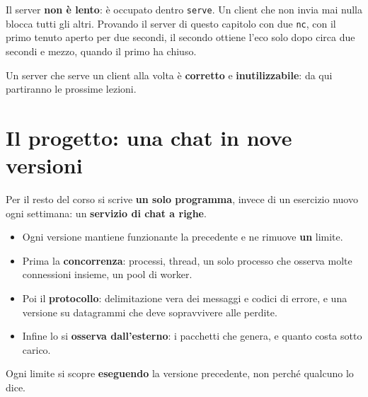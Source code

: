 Il server \textbf{non è lento}: è occupato dentro \texttt{serve}. Un client che non invia mai nulla blocca tutti gli
altri. Provando il server di questo capitolo con due \texttt{nc}, con il primo tenuto aperto per due secondi, il secondo
ottiene l'eco solo dopo circa due secondi e mezzo, quando il primo ha chiuso.

Un server che serve un client alla volta è \textbf{corretto} e \textbf{inutilizzabile}: da qui partiranno le prossime
lezioni.

\section{Il progetto: una chat in nove versioni}

Per il resto del corso si scrive \textbf{un solo programma}, invece di un esercizio nuovo ogni settimana: un
\textbf{servizio di chat a righe}.
\begin{itemize}
    \item Ogni versione mantiene funzionante la precedente e ne rimuove \textbf{un} limite.
    \item Prima la \textbf{concorrenza}: processi, thread, un solo processo che osserva molte connessioni insieme, un pool
          di worker.
    \item Poi il \textbf{protocollo}: delimitazione vera dei messaggi e codici di errore, e una versione su datagrammi
          che deve sopravvivere alle perdite.
    \item Infine lo si \textbf{osserva dall'esterno}: i pacchetti che genera, e quanto costa sotto carico.
\end{itemize}
Ogni limite si scopre \textbf{eseguendo} la versione precedente, non perché qualcuno lo dice.

